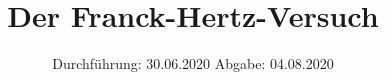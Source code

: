 

\subject{V601}
\title{Der Franck-Hertz-Versuch}
\date{%
  Durchführung: 30.06.2020
  \hspace{3em}
  Abgabe: 04.08.2020
}



\maketitle
\thispagestyle{empty}
\tableofcontents
\newpage








\printbibliography{}


